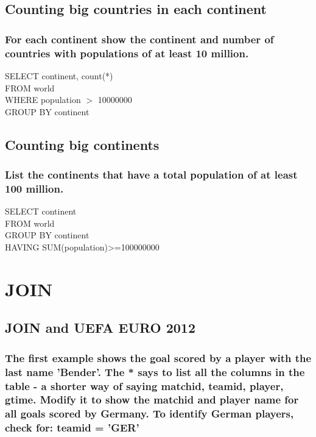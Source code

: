 \documentclass[10pt, oneside]{article}
\begin{document}
\subsection{Counting big countries in each continent}

\subsubsection{For each continent show the continent and number of countries with populations of at least 10 million.}

SELECT continent, count(*)\\
FROM world\\
WHERE population $>$ 10000000\\
GROUP BY continent\\

\subsection{Counting big continents}

\subsubsection{List the continents that have a total population of at least 100 million.}

SELECT continent\\
FROM world\\
GROUP BY continent\\
HAVING SUM(population)>=100000000\\

\section{JOIN}

\subsection{JOIN and UEFA EURO 2012}

\subsubsection{The first example shows the goal scored by a player with the last name 'Bender'. The * says to list all the columns in the table - a shorter way of saying matchid, teamid, player, gtime. Modify it to show the matchid and player name for all goals scored by Germany. To identify German players, check for: teamid = 'GER'}
\end{document}
